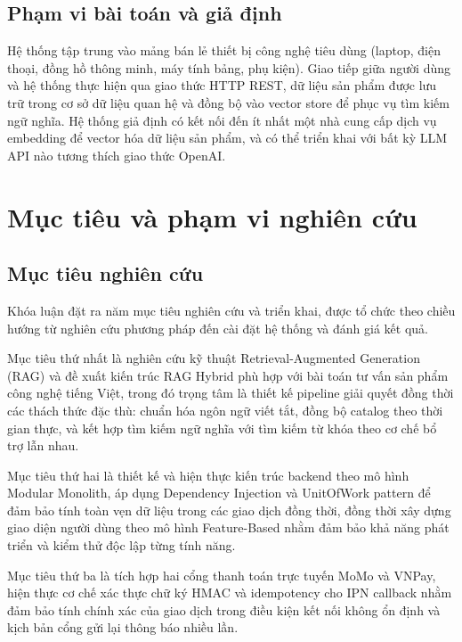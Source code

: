 \subsection{Phạm vi bài toán và giả định}

Hệ thống tập trung vào mảng bán lẻ thiết bị công nghệ tiêu dùng (laptop, điện thoại, đồng hồ thông minh, máy tính bảng, phụ kiện). Giao tiếp giữa người dùng và hệ thống thực hiện qua giao thức HTTP REST, dữ liệu sản phẩm được lưu trữ trong cơ sở dữ liệu quan hệ và đồng bộ vào vector store để phục vụ tìm kiếm ngữ nghĩa. Hệ thống giả định có kết nối đến ít nhất một nhà cung cấp dịch vụ embedding để vector hóa dữ liệu sản phẩm, và có thể triển khai với bất kỳ LLM API nào tương thích giao thức OpenAI.

\section{Mục tiêu và phạm vi nghiên cứu}
\label{sec:c1_objectives}

\subsection{Mục tiêu nghiên cứu}

Khóa luận đặt ra năm mục tiêu nghiên cứu và triển khai, được tổ chức theo chiều hướng từ nghiên cứu phương pháp đến cài đặt hệ thống và đánh giá kết quả.

Mục tiêu thứ nhất là nghiên cứu kỹ thuật Retrieval-Augmented Generation (RAG) và đề xuất kiến trúc RAG Hybrid phù hợp với bài toán tư vấn sản phẩm công nghệ tiếng Việt, trong đó trọng tâm là thiết kế pipeline giải quyết đồng thời các thách thức đặc thù: chuẩn hóa ngôn ngữ viết tắt, đồng bộ catalog theo thời gian thực, và kết hợp tìm kiếm ngữ nghĩa với tìm kiếm từ khóa theo cơ chế bổ trợ lẫn nhau.

Mục tiêu thứ hai là thiết kế và hiện thực kiến trúc backend theo mô hình Modular Monolith, áp dụng Dependency Injection và UnitOfWork pattern để đảm bảo tính toàn vẹn dữ liệu trong các giao dịch đồng thời, đồng thời xây dựng giao diện người dùng theo mô hình Feature-Based nhằm đảm bảo khả năng phát triển và kiểm thử độc lập từng tính năng.

Mục tiêu thứ ba là tích hợp hai cổng thanh toán trực tuyến MoMo và VNPay, hiện thực cơ chế xác thực chữ ký HMAC và idempotency cho IPN callback nhằm đảm bảo tính chính xác của giao dịch trong điều kiện kết nối không ổn định và kịch bản cổng gửi lại thông báo nhiều lần.

